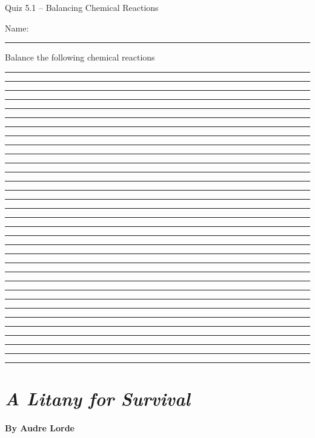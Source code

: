 \documentclass[11pt, letterpaper]{memoir}
\begin{document}
	\begin{center}
		{\large Quiz 5.1 --	Balancing Chemical Reactions}
	\end{center}
	{\large Name: \rule[-1mm]{4in}{.1pt} 

Balance the following chemical reactions


\vspace{3em} \rule[-2pt]{1em}{.1pt} \rule[-2pt]{1em}{.1pt}\rule[-2pt]{1em}{.1pt}

\vspace{3em} \rule[-2pt]{1em}{.1pt}\rule[-2pt]{1em}{.1pt}\rule[-2pt]{1em}{.1pt}\rule[-2pt]{1em}{.1pt}

\vspace{3em} \rule[-2pt]{1em}{.1pt}\rule[-2pt]{1em}{.1pt}\rule[-2pt]{1em}{.1pt}

\vspace{3em} \rule[-2pt]{1em}{.1pt}\rule[-2pt]{1em}{.1pt}\rule[-2pt]{1em}{.1pt}

\vspace{3em} \rule[-2pt]{1em}{.1pt}\rule[-2pt]{1em}{.1pt}\rule[-2pt]{1em}{.1pt}\rule[-2pt]{1em}{.1pt}

\vspace{3em} \rule[-2pt]{1em}{.1pt}\rule[-2pt]{1em}{.1pt}\rule[-2pt]{1em}{.1pt}\rule[-2pt]{1em}{.1pt}

\vspace{3em} \rule[-2pt]{1em}{.1pt}\rule[-2pt]{1em}{.1pt}\rule[-2pt]{1em}{.1pt}\rule[-2pt]{1em}{.1pt}

\vspace{3em} \rule[-2pt]{1em}{.1pt}\rule[-2pt]{1em}{.1pt}\rule[-2pt]{1em}{.1pt}\rule[-2pt]{1em}{.1pt}

\vspace{3em} \rule[-2pt]{1em}{.1pt}\rule[-2pt]{1em}{.1pt}\rule[-2pt]{1em}{.1pt}\rule[-2pt]{1em}{.1pt}
\newpage
{}
\pagestyle{empty}
\addtocounter{page}{-1}
\section*{\emph{A Litany for Survival}}
\paragraph{By Audre Lorde}~

}
\end{document}
